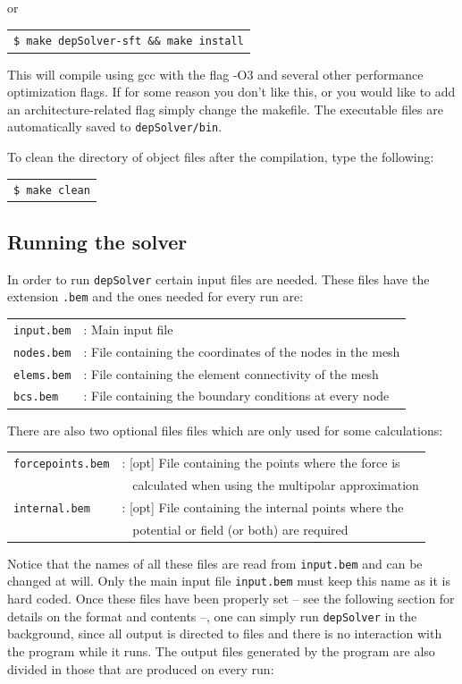 \documentclass[12pt]{report}
\begin{document}
or

\begin{tabular}{l}
\texttt{\$ make depSolver-sft \&\& make install}
\end{tabular}

This will compile using gcc with the flag -O3 and several other performance optimization flags. If for some reason you don't like this, or you would like to add an architecture-related flag simply change the makefile. The executable files are automatically saved to \verb+depSolver/bin+.

To clean the directory of object files after the compilation, type the following:

\begin{tabular}{l}
\texttt{\$ make clean}
\end{tabular}

\subsection{Running the solver}
In order to run \verb+depSolver+ certain input files are needed. These files have the extension \verb+.bem+ and the ones needed for every run are:

\begin{tabular}{ll}
\texttt{input.bem}&: Main input file\\
\texttt{nodes.bem}&: File containing the coordinates of the nodes in the mesh\\
\texttt{elems.bem}&: File containing the element connectivity of the mesh\\
\texttt{bcs.bem}&: File containing the boundary conditions at every node
\end{tabular}

There are also two optional files files which are only used for some calculations: 

\begin{tabular}{ll}
\texttt{forcepoints.bem}&: [opt] File containing the points where the force is\\
  & \verb+ + calculated when using the multipolar approximation\\
\texttt{internal.bem}&: [opt] File containing the internal points where the\\
  & \verb+ + potential or field (or both) are required
\end{tabular}

Notice that the names of all these files are read from \verb+input.bem+ and can be changed at will. Only the main input file \verb+input.bem+ must keep this name as it is hard coded. Once these files have been properly set -- see the following section for details on the format and contents --, one can simply run \verb+depSolver+ in the background, since all output is directed to files and there is no interaction with the program while it runs. The output files generated by the program are also divided in those that are produced on every run:
\end{document}
